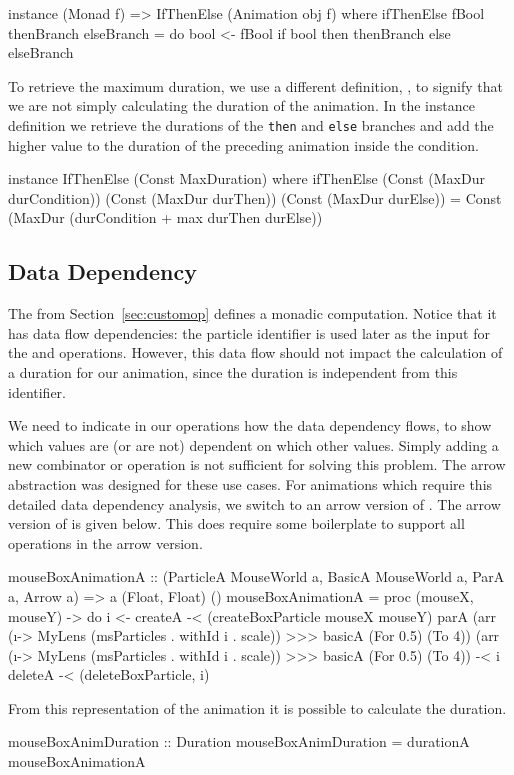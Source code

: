 \begin{code}
instance (Monad f) => IfThenElse (Animation obj f) where
  ifThenElse fBool thenBranch elseBranch = do
    bool <- fBool
    if bool then thenBranch else elseBranch
\end{code}

To retrieve the maximum duration, we use a different  definition, , to signify that we are not simply calculating the duration of the animation. In the instance definition we retrieve the durations of the \texttt{then} and \texttt{else} branches and add the higher value to the duration of the preceding animation inside the condition.

\begin{code}
 instance IfThenElse (Const MaxDuration) where
   ifThenElse (Const (MaxDur durCondition))
              (Const (MaxDur durThen))
              (Const (MaxDur durElse)) =
   Const (MaxDur (durCondition + max durThen durElse))
\end{code}

\subsection{Data Dependency}

The  from Section~\ref{sec:customop} defines a monadic computation. Notice that it has data flow dependencies: the particle identifier  is used later as the input for the  and  operations. However, this data flow should not impact the calculation of a duration for our animation, since the duration is independent from this identifier.

We need to indicate in our operations how the data dependency flows, to show which values are (or are not) dependent on which other values. Simply adding a new combinator or operation is not sufficient for solving this problem. The arrow abstraction \cite{DBLP:journals/scp/Hughes00} was designed for these use cases. For animations which require this detailed data dependency analysis, we switch to an arrow version of \dsl{}. The arrow version of  is given below. This does require some boilerplate to support all operations in the arrow version.

\begin{code}
mouseBoxAnimationA ::
  (ParticleA MouseWorld a,
   BasicA MouseWorld a, ParA a, Arrow a) =>
   a (Float, Float) ()
mouseBoxAnimationA = proc (mouseX, mouseY) -> do
  i <- createA -< (createBoxParticle mouseX mouseY)
  parA (arr (\i -> MyLens (msParticles . withId i . scale))
        >>> basicA (For 0.5) (To 4))
       (arr (\i -> MyLens (msParticles . withId i . scale))
        >>> basicA (For 0.5) (To 4)) -< i
  deleteA -< (deleteBoxParticle, i)
\end{code}

From this representation of the animation it is possible to calculate the duration.

\begin{code}
mouseBoxAnimDuration :: Duration
mouseBoxAnimDuration = durationA mouseBoxAnimationA
\end{code}
